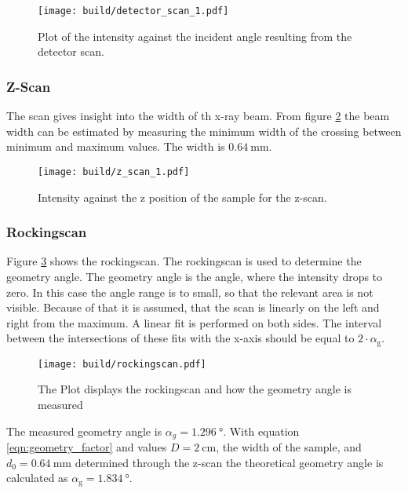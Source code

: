 \begin{figure}[H]
  \centering
  \texttt{[image: build/detector\_scan\_1.pdf]}
  \caption{Plot of the intensity against the incident angle resulting from the detector scan.}
  \label{fig:detector_scan}
\end{figure}

\subsubsection{Z-Scan}
The scan gives insight into the width of th x-ray beam. From figure \ref{fig:z_scan} the beam width can
be estimated by measuring the minimum width of the crossing between minimum and maximum values.
The width is $\qty{0.64}{\milli\meter}$.
\begin{figure}[H]
  \centering
  \texttt{[image: build/z\_scan\_1.pdf]}
  \caption{Intensity against the z position of the sample for the z-scan.}
  \label{fig:z_scan}
\end{figure}

\subsubsection{Rockingscan}\label{sec:rockingscan}
Figure \ref{fig:rockingscan} shows the rockingscan. The rockingscan is used to determine the geometry angle. 
The geometry angle is the angle, where the intensity drops to zero. In this case the angle range is to small, 
so that the relevant area is not visible. Because of that it is assumed, that 
the scan is linearly on the left and right from the maximum. A linear fit is performed on both sides.
The interval between the intersections of these fits with the x-axis should be equal to $2\cdot\alpha_\text{g}$.

\begin{figure}[H]
  \centering
  \texttt{[image: build/rockingscan.pdf]}
  \caption{The Plot displays the rockingscan and how the geometry angle is measured}
  \label{fig:rockingscan}
\end{figure}

The measured geometry angle is $\alpha_g=\qty{1.296}{\degree}$. 
With equation \eqref{eqn:geometry_factor} and values $D=\qty{2}{\cm}$, the width of the sample, and $d_0=\qty{0.64}{\milli\meter}$ determined through the z-scan the 
theoretical geometry angle is calculated as $\alpha_\text{g}=\qty{1.834}{\degree}$.





